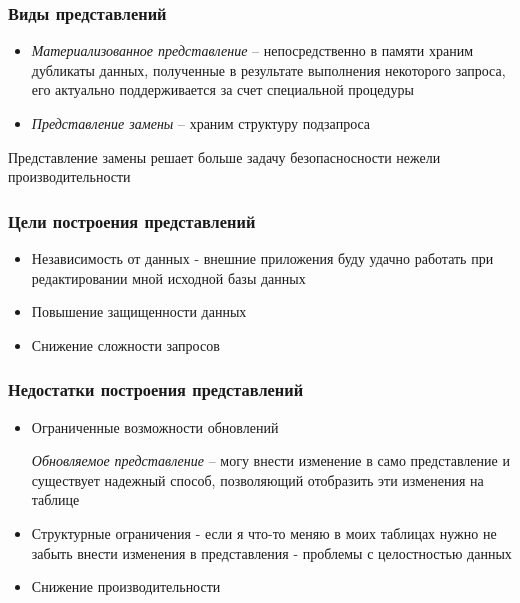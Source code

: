 \documentclass[12pt, a4paper]{article}
\begin{document}
\subsubsection{Виды представлений}

\begin{itemize}
    \item \emph{Материализованное представление} -- непосредственно в памяти храним дубликаты данных, полученные в результате выполнения некоторого запроса, его актуально поддерживается за счет специальной процедуры
    \item \emph{Представление замены} -- храним структуру подзапроса
\end{itemize}
Представление замены решает больше задачу безопасносности нежели производительности

\subsubsection{Цели построения представлений}
\begin{itemize}
    \item Независимость от данных - внешние приложения буду удачно работать при редактировании мной исходной базы данных
    \item Повышение защищенности данных
    \item Снижение сложности запросов
\end{itemize}

\subsubsection{Недостатки построения представлений}
\begin{itemize}
    \item Ограниченные возможности обновлений
    
    \emph{Обновляемое представление} -- могу внести изменение в само представление и существует надежный способ, позволяющий отобразить эти изменения на таблице
    \item Структурные ограничения - если я что-то меняю в моих таблицах нужно не забыть внести изменения в представления - проблемы с целостностью данных
    \item Снижение производительности 
\end{itemize}
\end{document}
